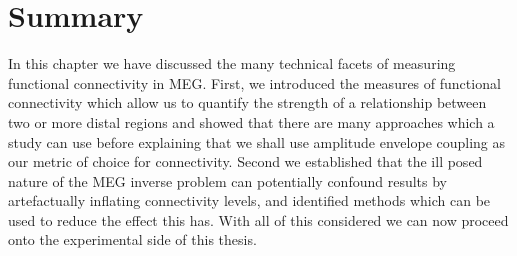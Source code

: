 \section*{Summary}
In this chapter we have discussed the many technical facets of measuring functional connectivity in MEG. First, we introduced the measures of functional connectivity which allow us to quantify the strength of a relationship between two or more distal regions and showed that there are many approaches which a study can use before explaining that we shall use amplitude envelope coupling as our metric of choice for connectivity. Second we established that the ill posed nature of the MEG inverse problem can potentially confound results by artefactually inflating connectivity levels, and identified methods which can be used to reduce the effect this has. With all of this considered we can now proceed onto the experimental side of this thesis.
